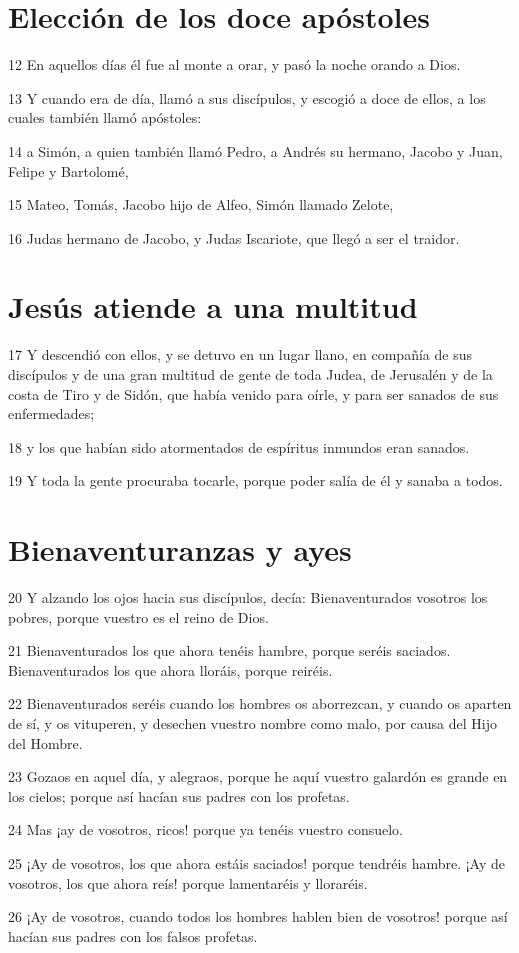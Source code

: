 \section*{Elección de los doce apóstoles}

\par 12 En aquellos días él fue al monte a orar, y pasó la noche orando a Dios.
\par 13 Y cuando era de día, llamó a sus discípulos, y escogió a doce de ellos, a los cuales también llamó apóstoles:
\par 14 a Simón, a quien también llamó Pedro, a Andrés su hermano, Jacobo y Juan, Felipe y Bartolomé,
\par 15 Mateo, Tomás, Jacobo hijo de Alfeo, Simón llamado Zelote,
\par 16 Judas hermano de Jacobo, y Judas Iscariote, que llegó a ser el traidor.

\section*{Jesús atiende a una multitud}

\par 17 Y descendió con ellos, y se detuvo en un lugar llano, en compañía de sus discípulos y de una gran multitud de gente de toda Judea, de Jerusalén y de la costa de Tiro y de Sidón, que había venido para oírle, y para ser sanados de sus enfermedades;
\par 18 y los que habían sido atormentados de espíritus inmundos eran sanados.
\par 19 Y toda la gente procuraba tocarle, porque poder salía de él y sanaba a todos.

\section*{Bienaventuranzas y ayes}

\par 20 Y alzando los ojos hacia sus discípulos, decía: Bienaventurados vosotros los pobres, porque vuestro es el reino de Dios.
\par 21 Bienaventurados los que ahora tenéis hambre, porque seréis saciados. Bienaventurados los que ahora lloráis, porque reiréis.
\par 22 Bienaventurados seréis cuando los hombres os aborrezcan, y cuando os aparten de sí, y os vituperen, y desechen vuestro nombre como malo, por causa del Hijo del Hombre.
\par 23 Gozaos en aquel día, y alegraos, porque he aquí vuestro galardón es grande en los cielos; porque así hacían sus padres con los profetas.
\par 24 Mas ¡ay de vosotros, ricos! porque ya tenéis vuestro consuelo.
\par 25 ¡Ay de vosotros, los que ahora estáis saciados! porque tendréis hambre. ¡Ay de vosotros, los que ahora reís! porque lamentaréis y lloraréis.
\par 26 ¡Ay de vosotros, cuando todos los hombres hablen bien de vosotros! porque así hacían sus padres con los falsos profetas.

